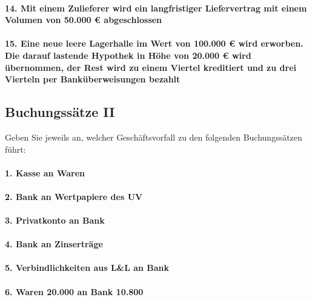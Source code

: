 \documentclass[paper=a4, fontsize=11pt]{scrartcl}
\numberwithin{equation}{section}
\numberwithin{figure}{section}
\numberwithin{table}{section}
\begin{document}
\paragraph{14. Mit einem Zulieferer wird ein langfristiger Liefervertrag mit einem Volumen von 50.000 € abgeschlossen}

\paragraph{15. Eine neue leere Lagerhalle im Wert von 100.000 € wird erworben. Die darauf lastende Hypothek in Höhe von 20.000 € wird übernommen, der Rest wird zu einem Viertel kreditiert und zu drei Vierteln per Banküberweisungen bezahlt}

\subsection{Buchungssätze II}
Geben Sie jeweils an, welcher Geschäftsvorfall zu den folgenden Buchungssätzen führt: \\

\paragraph{1. Kasse an Waren}

\paragraph{2. Bank an Wertpapiere des UV}

\paragraph{3. Privatkonto an Bank}

\paragraph{4. Bank an Zinserträge}

\paragraph{5. Verbindlichkeiten aus L&L an Bank}

\paragraph{6. Waren 20.000 an Bank 10.800}
\end{document}
